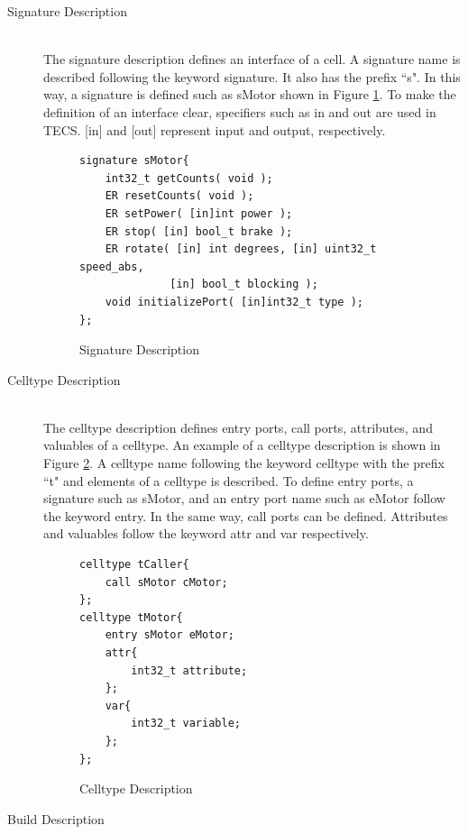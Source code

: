 \documentclass{sig-alternate-05-2015}
\begin{document}
\begin{description}
    \item[{\mybf Signature Description}]\mbox{}\\
        The {\myit signature} description defines an interface of a {\myit cell}.
        A {\myit signature} name is described following the keyword {\myit signature}.
        It also has the prefix ``s".
        In this way, a {\myit signature} is defined such as sMotor shown in Figure \ref{signature}.
        To make the definition of an interface clear, specifiers such as in and out are used in TECS.
        [in] and [out] represent input and output, respectively.
\begin{figure}[t]
\centering
\begin{lstlisting}
signature sMotor{
    int32_t getCounts( void );
    ER resetCounts( void );
    ER setPower( [in]int power );
    ER stop( [in] bool_t brake );
    ER rotate( [in] int degrees, [in] uint32_t speed_abs,
              [in] bool_t blocking );
    void initializePort( [in]int32_t type );
};
\end{lstlisting}
\caption{Signature Description}
\label{signature}
\end{figure}
    \item[{\mybf Celltype Description}]\mbox{}\\
        The {\myit celltype} description defines {\myit entry} ports, {\myit call} ports, attributes, and valuables of a {\myit celltype}.
        An example of a {\myit celltype} description is shown in Figure \ref{celltype}.
        A {\myit celltype} name following the keyword {\myit celltype} with the prefix ``t" and elements of a {\myit celltype} is described.
        To define {\myit entry} ports, a {\myit signature} such as sMotor, and an {\myit entry} port name such as eMotor follow the keyword {\myit entry}.
        In the same way, {\myit call} ports can be defined.
        Attributes and valuables follow the keyword {\myit attr} and {\myit var} respectively.
\begin{figure}[t]
\centering
\begin{lstlisting}
celltype tCaller{
    call sMotor cMotor;
};
celltype tMotor{
    entry sMotor eMotor;
    attr{
        int32_t attribute;
    };
    var{
        int32_t variable;
    };
};
\end{lstlisting}
\caption{Celltype Description}
\label{celltype}
\end{figure}
    \item[{\mybf Build Description}]\mbox{}\\

\end{description}
\end{document}
